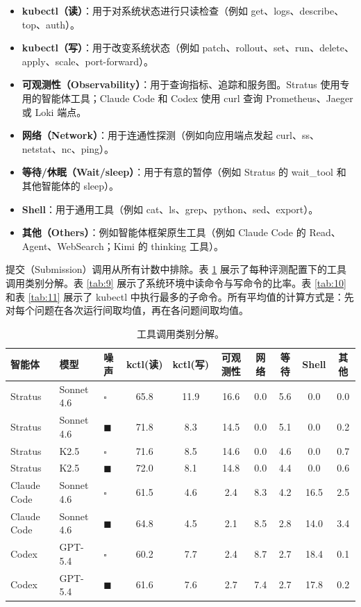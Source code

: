 \documentclass[11pt,UTF8,fontset=fandol]{ctexart}
\begin{document}
\begin{itemize}[leftmargin=1.5em]
\item \textbf{kubectl（读）}：用于对系统状态进行只读检查（例如 get、logs、describe、top、auth）。
\item \textbf{kubectl（写）}：用于改变系统状态（例如 patch、rollout、set、run、delete、apply、scale、port-forward）。
\item \textbf{可观测性（Observability）}：用于查询指标、追踪和服务图。Stratus 使用专用的智能体工具；Claude Code 和 Codex 使用 curl 查询 Prometheus、Jaeger 或 Loki 端点。
\item \textbf{网络（Network）}：用于连通性探测（例如向应用端点发起 curl、ss、netstat、nc、ping）。
\item \textbf{等待/休眠（Wait/sleep）}：用于有意的暂停（例如 Stratus 的 wait\_tool 和其他智能体的 sleep）。
\item \textbf{Shell}：用于通用工具（例如 cat、ls、grep、python、sed、export）。
\item \textbf{其他（Others）}：例如智能体框架原生工具（例如 Claude Code 的 Read、Agent、WebSearch；Kimi 的 thinking 工具）。
\end{itemize}

提交（Submission）调用从所有计数中排除。表 \ref{tab:8} 展示了每种评测配置下的工具调用类别分解。表 \ref{tab:9} 展示了系统环境中读命令与写命令的比率。表 \ref{tab:10} 和表 \ref{tab:11} 展示了 kubectl 中执行最多的子命令。所有平均值的计算方式是：先对每个问题在各次运行间取均值，再在各问题间取均值。

\begin{table}[H]\centering
\caption{工具调用类别分解。}
\label{tab:8}
\setlength{\tabcolsep}{5pt}
\begin{tabular}{lllccccccc}
\toprule
智能体 & 模型 & 噪声 & kctl(读) & kctl(写) & 可观测性 & 网络 & 等待 & Shell & 其他 \\
\midrule
Stratus & Sonnet 4.6 & $\square$ & 65.8 & 11.9 & 16.6 & 0.0 & 5.6 & 0.0 & 0.0 \\
Stratus & Sonnet 4.6 & $\blacksquare$ & 71.8 & 8.3 & 14.5 & 0.0 & 5.1 & 0.0 & 0.2 \\
Stratus & K2.5 & $\square$ & 71.6 & 8.5 & 14.6 & 0.0 & 4.6 & 0.0 & 0.7 \\
Stratus & K2.5 & $\blacksquare$ & 72.0 & 8.1 & 14.8 & 0.0 & 4.4 & 0.0 & 0.6 \\
Claude Code & Sonnet 4.6 & $\square$ & 61.5 & 4.6 & 2.4 & 8.3 & 4.2 & 16.5 & 2.5 \\
Claude Code & Sonnet 4.6 & $\blacksquare$ & 64.8 & 4.5 & 2.1 & 8.5 & 2.8 & 14.0 & 3.4 \\
Codex & GPT-5.4 & $\square$ & 60.2 & 7.7 & 2.4 & 8.7 & 2.7 & 18.4 & 0.1 \\
Codex & GPT-5.4 & $\blacksquare$ & 61.6 & 7.6 & 2.7 & 7.4 & 2.7 & 17.8 & 0.2 \\
\bottomrule
\end{tabular}
\end{table}
\end{document}
